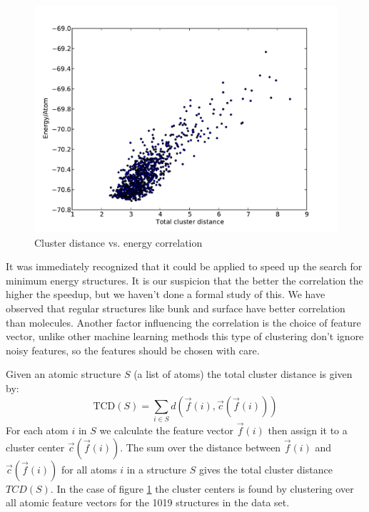 \documentclass[%
 aps,
 prl,%
 amsmath,amssymb,
 reprint,%
]{revtex4-1}
\begin{document}
\begin{figure}[h]
    \centering
    \includegraphics[width=1.0\columnwidth]{decoorL2_5_fgen_Ti13O26Ridge_9_11_9_1510066208.pdf}
    \caption{Cluster distance vs. energy correlation}
    \label{fig_corr}
\end{figure}

It was immediately recognized that it could be applied to speed up the search for minimum energy structures.
It is our suspicion that the better the correlation the higher the speedup, 
but we haven't done a formal study of this. We have observed that regular structures like bunk and surface have better correlation than molecules. Another factor influencing the correlation is the choice of feature vector, 
unlike other machine learning methods this type of clustering don't ignore noisy features, so the features should be chosen with care.  
 
Given an atomic structure $S$ (a list of atoms) the total cluster distance is given by:
\begin{equation}
\text{TCD}(S) = \sum_{i \in S} d(\vec f(i), \vec c(\vec f(i))) \label{eq3}
\end{equation}
For each atom $i$ in $S$ we calculate the feature vector $\vec f(i)$ then 
assign it to a cluster center $\vec c(\vec f(i))$.   
The sum over the distance between $\vec f(i)$ and $\vec c(\vec f(i))$ for all atoms $i$ in a structure $S$ 
gives the total cluster distance $TCD(S)$.
In the case of figure \ref{fig_corr} the cluster centers is found by clustering over all atomic feature vectors 
for the 1019 structures in the data set. 
\end{document}
